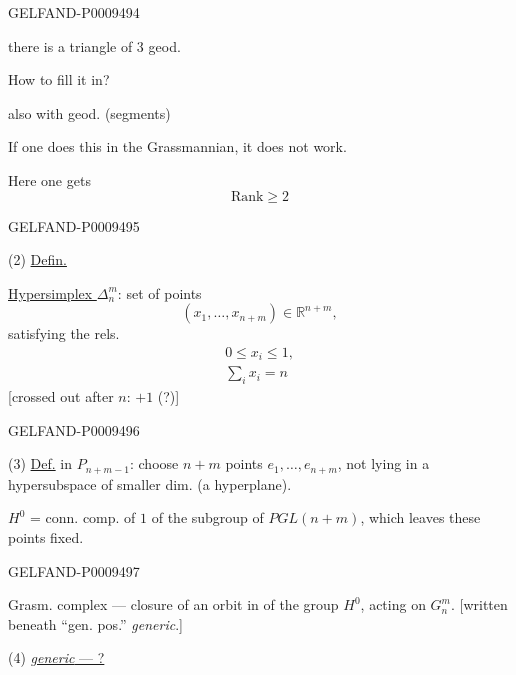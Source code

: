 \begin{GelfandAdjacentEvidence}{GELFAND-P000949}{4}

there is a triangle of 3 geod.

How to fill it in?

also with geod. (segments)

If one does this in the Grassmannian, it does not work.

Here one gets
\[
 \mathrm{Rank}\geqslant 2
\]
\end{GelfandAdjacentEvidence}
\begin{GelfandAdjacentEvidence}{GELFAND-P000949}{5}


(2) \underline{Defin.}\par
\underline{Hypersimplex $\Delta_n^m$}: set of points
\[
 (x_1,\ldots,x_{n+m})\in\mathbb R^{n+m},
\]
satisfying the rels.
\begin{gather*}
 0\leq x_i\leq 1,\\
 \sum_i x_i=n
\end{gather*}
[crossed out after $n$: \sout{\mbox{\(+1\)}} (?)]
\end{GelfandAdjacentEvidence}
\begin{GelfandAdjacentEvidence}{GELFAND-P000949}{6}


(3) \underline{Def.}\qquad {} in $P_{n+m-1}$:
choose $n+m$ points $e_1,\ldots,e_{n+m}$, not lying in a hypersubspace of smaller dim. (a hyperplane).

$H^0$ = conn. comp. of $1$ of the subgroup of $PGL(n+m)$, which leaves these points fixed.
\end{GelfandAdjacentEvidence}
\begin{GelfandAdjacentEvidence}{GELFAND-P000949}{7}


Grasm. complex --- closure of an orbit in  of the group $H^0$,
acting on $G_n^m$.
[written beneath “gen. pos.” \textit{generic}.]
\end{GelfandAdjacentEvidence}


(4) \underline{\textit{generic} --- ?}

